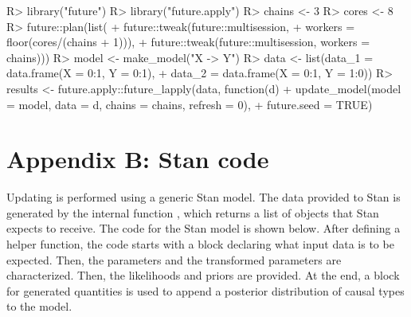 \documentclass[
  11pt,
  article]{jss}
\renewcommand{\texttt}[1]{\code{#1}}
\begin{document}
\begin{CodeChunk}
\begin{CodeInput}
R> library("future")
R> library("future.apply")
R> chains <- 3
R> cores <- 8
R> future::plan(list(
+    future::tweak(future::multisession, 
+    workers = floor(cores/(chains + 1))),
+    future::tweak(future::multisession, workers = chains)))
R> model <- make_model("X -> Y")
R> data <- list(data_1 = data.frame(X = 0:1, Y = 0:1), 
+    data_2 = data.frame(X = 0:1, Y = 1:0))
R> results <- future.apply::future_lapply(data, function(d) {
+    update_model(model = model, data = d, chains = chains, refresh = 0)},
+    future.seed = TRUE)
\end{CodeInput}

\newpage{}

\section*{Appendix B: Stan code}\label{sec-stancode}

Updating is performed using a generic Stan model. The data provided to
Stan is generated by the internal function \texttt{prep\_stan\_data()},
which returns a list of objects that Stan expects to receive. The code
for the Stan model is shown below. After defining a helper function, the
code starts with a block declaring what input data is to be expected.
Then, the parameters and the transformed parameters are characterized.
Then, the likelihoods and priors are provided. At the end, a block for
generated quantities is used to append a posterior distribution of
causal types to the model.


\end{CodeChunk}
\end{document}
